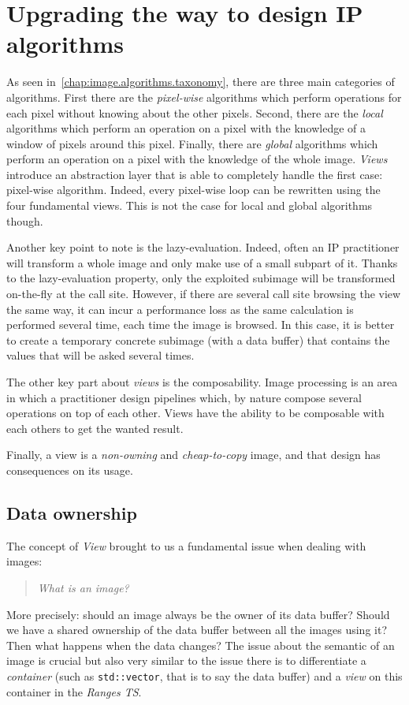 \section{Upgrading the way to design IP algorithms}

As seen in~\cref{chap:image.algorithms.taxonomy}, there are three main categories of algorithms. First there are the
\emph{pixel-wise} algorithms which perform operations for each pixel without knowing about the other pixels. Second,
there are the \emph{local} algorithms which perform an operation on a pixel with the knowledge of a window of pixels
around this pixel. Finally, there are \emph{global} algorithms which perform an operation on a pixel with the knowledge
of the whole image. \emph{Views} introduce an abstraction layer that is able to completely handle the first case:
pixel-wise algorithm. Indeed, every pixel-wise loop can be rewritten using the four fundamental views. This is not the
case for local and global algorithms though.

Another key point to note is the lazy-evaluation. Indeed, often an IP practitioner will transform a whole image and
only make use of a small subpart of it. Thanks to the lazy-evaluation property, only the exploited subimage will be
transformed on-the-fly at the call site. However, if there are several call site browsing the view the same way, it can
incur a performance loss as the same calculation is performed several time, each time the image is browsed. In this
case, it is better to create a temporary concrete subimage (with a data buffer) that contains the values that will be
asked several times.

The other key part about \emph{views} is the composability. Image processing is an area in which a practitioner design
pipelines which, by nature compose several operations on top of each other. Views have the ability to be composable with
each others to get the wanted result.

Finally, a view is a \emph{non-owning} and \emph{cheap-to-copy} image, and that design has consequences on its usage.

\subsection{Data ownership}

The concept of \emph{View} brought to us a fundamental issue when dealing with images: \blockquote{\emph{What is an
    image?}}. More precisely: should an image always be the owner of its data buffer? Should we have a shared ownership of
the data buffer between all the images using it? Then what happens when the data changes? The issue about the semantic
of an image is crucial but also very similar to the issue there is to differentiate a \emph{container} (such as
\texttt{std::vector}, that is to say the data buffer) and a \emph{view} on this container in the \emph{Ranges TS}.

